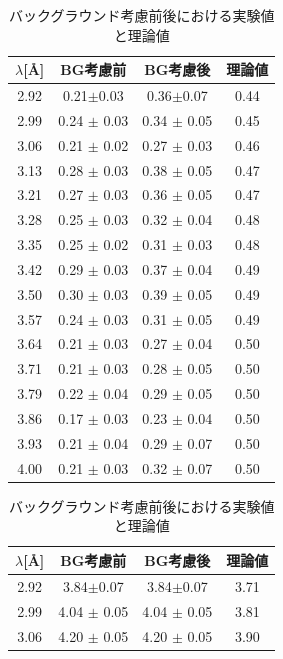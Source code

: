 \begin{table}[H]
\caption{バックグラウンド考慮前後における実験値と理論値}\label{Discussion_tbl_ABCDb}
\begin{minipage}{0.5\hsize}
\centering
\begin{tabular}{cccc}
$\lambda$[\AA]&BG考慮前&BG考慮後&理論値\\ \hline
2.92&0.21$\pm$0.03&0.36$\pm$0.07&0.44\\
2.99 	&	0.24 	$\pm$	0.03 	&	0.34 	$\pm$	0.05 	&	0.45 	\\
3.06 	&	0.21 	$\pm$	0.02 	&	0.27 	$\pm$	0.03 	&	0.46 	\\
3.13 	&	0.28 	$\pm$	0.03 	&	0.38 	$\pm$	0.05 	&	0.47 	\\
3.21 	&	0.27 	$\pm$	0.03 	&	0.36 	$\pm$	0.05 	&	0.47 	\\
3.28 	&	0.25 	$\pm$	0.03 	&	0.32 	$\pm$	0.04 	&	0.48 	\\
3.35 	&	0.25 	$\pm$	0.02 	&	0.31 	$\pm$	0.03 	&	0.48 	\\
3.42 	&	0.29 	$\pm$	0.03 	&	0.37 	$\pm$	0.04 	&	0.49 	\\
3.50 	&	0.30 	$\pm$	0.03 	&	0.39 	$\pm$	0.05 	&	0.49 	\\
3.57 	&	0.24 	$\pm$	0.03 	&	0.31 	$\pm$	0.05 	&	0.49 	\\
3.64 	&	0.21 	$\pm$	0.03 	&	0.27 	$\pm$	0.04 	&	0.50 	\\
3.71 	&	0.21 	$\pm$	0.03 	&	0.28 	$\pm$	0.05 	&	0.50 	\\
3.79 	&	0.22 	$\pm$	0.04 	&	0.29 	$\pm$	0.05 	&	0.50 	\\
3.86 	&	0.17 	$\pm$	0.03 	&	0.23 	$\pm$	0.04 	&	0.50 	\\
3.93 	&	0.21 	$\pm$	0.04 	&	0.29 	$\pm$	0.07 	&	0.50 	\\
4.00 	&	0.21 	$\pm$	0.03 	&	0.32 	$\pm$	0.07 	&	0.50	\\ \hline
\end{tabular}
\vspace{5mm}
\end{minipage}
\begin{minipage}{0.5\hsize}
\centering
\begin{tabular}{cccc}
$\lambda$[\AA]&BG考慮前&BG考慮後&理論値\\ \hline
2.92&3.84$\pm$0.07&3.84$\pm$0.07&3.71\\
2.99 	&	4.04 	$\pm$	0.05 	&	4.04 	$\pm$	0.05 	&	3.81 	\\
3.06 	&	4.20 	$\pm$	0.05 	&	4.20 	$\pm$	0.05 	&	3.90 	\\

\end{tabular}
\end{minipage}
\end{table}
